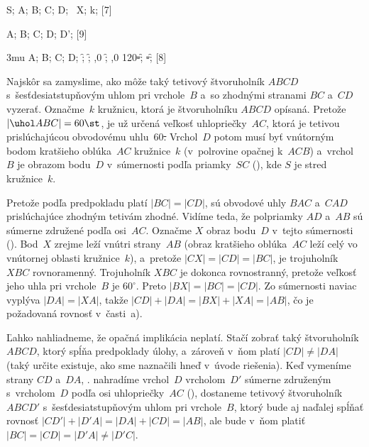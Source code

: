 {%
\fontplace
\lBpoint S;
\tpoint A; \lBpoint B; \bpoint C; \rpoint D;
\tpoint\ X;
\lpoint k;
[7] \hfil\Obr

\fontplace
\tpoint A; \lBpoint B; \bpoint C; \rpoint D;
\rpoint D';
[9] \hfil\Obr

\fontplace
\medmuskip3mu
\tpoint A; \lBpoint B; \bpoint C; \rpoint D;
\cpoint\f; \cpoint\f; \cpoint{},0 \f;
\cpoint{},0 120\st-\f; \st-\f;
[8] \hfil\Obr

Najskôr sa zamyslime, ako môže taký tetivový štvoruholník $ABCD$
s~šesťde\-siatstupňovým uhlom pri vrchole~$B$ a~so zhodnými
stranami $BC$ a~$CD$ vyzerať. Označme~$k$ kružnicu, ktorá je
štvoruholníku $ABCD$ opísaná. Pretože $|\uhol ABC|=60\st$, je už
určená veľkosť uhlopriečky~$AC$, ktorá je tetivou prislúchajúcou
obvodovému uhlu~60\st. Vrchol~$D$ potom musí byť vnútorným bodom
kratšieho oblúka~$AC$ kružnice~$k$ (v~polrovine opačnej k~$ACB$)
a~vrchol~$B$ je obrazom bodu~$D$ v~súmernosti podľa priamky~$SC$
(\obr), kde $S$ je stred kružnice~$k$.

\inspicture{}

Pretože podľa predpokladu platí $|BC|=|CD|$, sú obvodové uhly $BAC$
a~$CAD$ prislúchajúce zhodným tetivám zhodné. Vidíme teda, že
polpriamky $AD$ a~$AB$ sú súmerne združené podľa osi~$AC$.
Označme $X$ obraz bodu~$D$ v~tejto súmernosti (). Bod~$X$
zrejme leží vnútri strany~$AB$ (obraz kratšieho oblúka~$AC$ leží
celý vo vnútornej oblasti kružnice~$k$), a~pretože
$|CX|=|CD|=|BC|$, je trojuholník $XBC$ rovnoramenný.
%
%
Trojuholník $XBC$ je dokonca rovnostranný, pretože veľkosť jeho
uhla pri vrchole~$B$ je $60^{\circ}$. Preto $|BX|=|BC|=|CD|$.
Zo súmernosti naviac vyplýva $|DA|=|XA|$, takže
$|CD|+|DA|=|BX|+|XA|=|AB|$, čo je požadovaná rovnosť v~časti~a).

\smallskip
Ľahko nahliadneme, že opačná implikácia neplatí. Stačí zobrať
taký štvoruholník $ABCD$, ktorý spĺňa predpoklady úlohy, 
a~zároveň v~ňom platí $|CD|\ne|DA|$ (taký určite existuje, ako
sme naznačili hneď v~úvode riešenia). Keď vymeníme strany
$CD$ a~$DA$, \tj. nahradíme vrchol~$D$ vrcholom~$D'$
súmerne združeným s~vrcholom~$D$ podľa osi uhlopriečky~$AC$
(\obr), dostaneme tetivový štvoruholník $ABCD'$ 
s~šesťdesiatstupňovým uhlom pri vrchole~$B$, ktorý bude aj naďalej
spĺňať rovnosť $|CD'|+|D'A|=|DA|+|CD|=|AB|$, ale bude v~ňom
platiť $|BC|=|CD|=|D'A|\ne|D'C|$.

}
